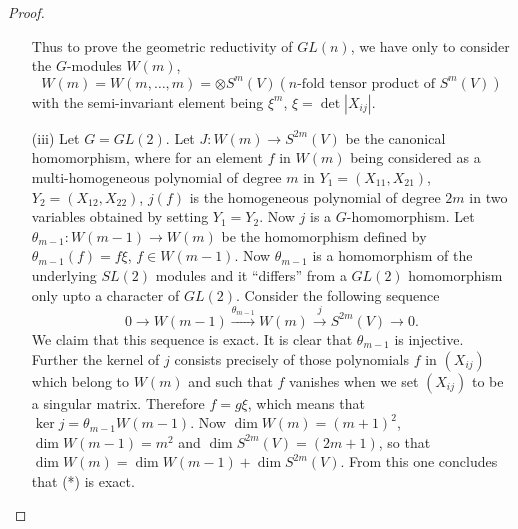 \begin{proof}
\begin{itemize}
Thus to prove the geometric reductivity of $GL(n)$, we have only to consider the $G$-modules $W(m)$,
{\fontsize{10pt}{12pt}\selectfont
$$
W(m)=W(m,\ldots,m)=\otimes S^{m}(V)(n\text{-fold tensor product of } S^{m}(V))
$$}\relax
with the semi-invariant element being $\xi^{m}$, $\xi=\det |X_{ij}|$.

\item[(iii)] Let $G=GL(2)$. Let $J:W(m)\to S^{2m}(V)$ be the canonical homomorphism, where for an element $f$ in $W(m)$ being considered as a multi-homogeneous polynomial of degree $m$ in $Y_{1}=(X_{11},X_{21})$, $Y_{2}=(X_{12},X_{22})$, $j(f)$ is the homogeneous polynomial of degree $2m$ in two variables obtained by setting $Y_{1}=Y_{2}$. Now $j$ is a $G$-homomorphism. Let $\theta_{m-1}:W(m-1)\to W(m)$ be the homomorphism defined by $\theta_{m-1}(f)=f\xi$, $f\in W(m-1)$. Now $\theta_{m-1}$ is a homomorphism of the underlying $SL(2)$ modules and it ``differs'' from a $GL(2)$ homomorphism only upto a character of $GL(2)$. Consider the following sequence
\begin{equation*}
0\to W(m-1)\xrightarrow{\theta_{m-1}}W(m)\xrightarrow{j}S^{2m}(V)\to 0.\tag{*}
\end{equation*}
We claim that this sequence is exact. It is clear that $\theta_{m-1}$ is injective. Further the kernel of $j$ consists precisely of those polynomials $f$ in $(X_{ij})$ which belong to $W(m)$ and such that $f$ vanishes when we set $(X_{ij})$ to be a singular matrix. Therefore $f=g\xi$, which means that $\ker j=\theta_{m-1}W(m-1)$. Now $\dim W(m)=(m+1)^{2}$, $\dim W(m-1)=m^{2}$ and $\dim S^{2m}(V)=(2m+1)$, so that $\dim W(m)=\dim W(m-1)+\dim S^{2m}(V)$. From this one concludes that (*) is exact.


\end{itemize}
\end{proof}
